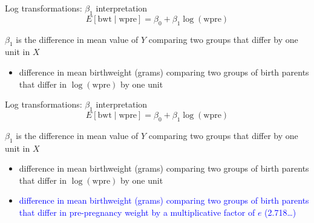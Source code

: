 \documentclass[10pt,t]{beamer}
\begin{document}
\begin{frame}{Log transformations: $\beta_1$ interpretation}
$$
E[\text{bwt} \mid \text{wpre}] = \beta_0 + \beta_1 \log(\text{wpre})
$$

\vspace{0.3cm}

$\beta_1$ is the difference in mean value of $Y$ comparing two groups that differ by one unit in $X$

\begin{itemize}
	\item[] difference in mean birthweight (grams) comparing two groups of birth parents that differ in $\log(\text{wpre})$ by one unit
\end{itemize}

\end{frame}

\begin{frame}{Log transformations: $\beta_1$ interpretation}
$$
E[\text{bwt} \mid \text{wpre}] = \beta_0 + \beta_1 \log(\text{wpre})
$$

\vspace{0.3cm}

$\beta_1$ is the difference in mean value of $Y$ comparing two groups that differ by one unit in $X$

\begin{itemize}
	\item[] difference in mean birthweight (grams) comparing two groups of birth parents that differ in $\log(\text{wpre})$ by one unit
	\item[] \textcolor{blue}{difference in mean birthweight (grams) comparing two groups of birth parents that differ in pre-pregnancy weight by a multiplicative factor of $e$ (2.718\dots)}
\end{itemize}

\end{frame}
\end{document}

